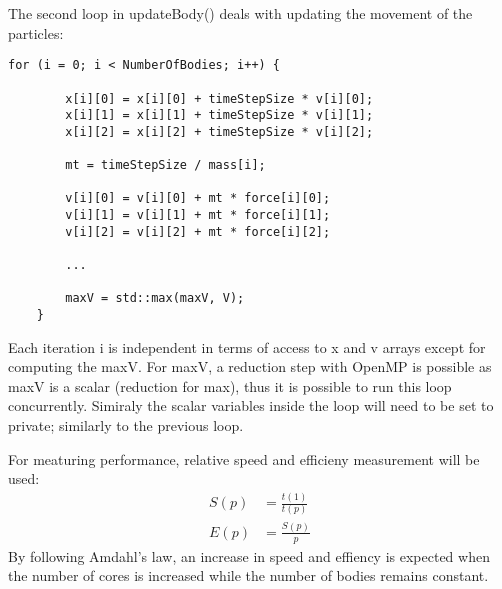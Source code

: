 \documentclass[11pt]{article}
\begin{document}
    The second loop in updateBody() deals with updating the movement of the particles:
    \begin{lstlisting}[style=CStyle]
    for (i = 0; i < NumberOfBodies; i++) {

        x[i][0] = x[i][0] + timeStepSize * v[i][0];
        x[i][1] = x[i][1] + timeStepSize * v[i][1];
        x[i][2] = x[i][2] + timeStepSize * v[i][2];

        mt = timeStepSize / mass[i];

        v[i][0] = v[i][0] + mt * force[i][0];
        v[i][1] = v[i][1] + mt * force[i][1];
        v[i][2] = v[i][2] + mt * force[i][2];

        ...

        maxV = std::max(maxV, V);
    }
    \end{lstlisting}
    Each iteration i is independent in terms of access to x and v arrays except for computing the maxV. For maxV, a reduction step with OpenMP is possible  as maxV is a scalar (reduction for max), thus it is possible to run this loop concurrently. Simiraly the scalar variables inside the loop will need to be set to private; similarly to the previous loop.

For meaturing performance, relative speed and efficieny measurement will be used:
\begin{align*}
    S(p) &= \frac{t(1)}{t(p)} \\
    E(p) &= \frac{S(p)}{p}
\end{align*}
By following Amdahl's law, an increase in speed and effiency is expected when the number of cores is increased while the number of bodies remains constant. 
\end{document}
